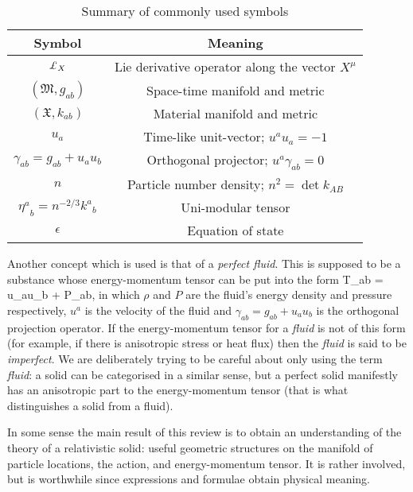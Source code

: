  
{\renewcommand{\arraystretch}{1.4}
\begin{table}%
\begin{center}
\begin{tabular}{||c |  c ||}
\hline
\textbf{Symbol} & \textbf{Meaning} \\
\hline
$\lied{X}$ & Lie derivative operator along the vector $X^{\mu}$\\\hline
$\left(\mathfrak{M}, g_{ab}\right)$ & Space-time manifold and metric\\\hline
$\left(\mathfrak{X}, k_{ab}\right)$ & Material manifold and metric \\\hline
$u_a$ & Time-like unit-vector; $u^au_a = -1$\\\hline
$\gamma_{ab} = g_{ab} + u_au_b$ & Orthogonal projector; $u^a\gamma_{ab}=0$\\\hline
$n$ & Particle number density; $n^2 = \det k_{AB} $\\\hline
${\eta^a}_b = n^{-2/3}{k^a}_b$ & Uni-modular tensor\\\hline
$\epsilon$ & Equation of state
\\\hline
\end{tabular}\caption{Summary of commonly used symbols}\label{tab:common}
\end{center}
\end{table}
}

Another  concept which is used is that of a \textit{perfect fluid}. This is supposed to be a substance whose energy-momentum tensor can be put into the form
\bea
T_{ab} = \rho u_au_b + P\gamma_{ab},
\eea
in which $\rho$ and $P$ are the  fluid's energy density and pressure respectively, $u^a$ is the velocity of the fluid and $\gamma_{ab} = g_{ab} + u_au_b$ is the orthogonal projection operator. If the energy-momentum tensor for a \textit{fluid} is not of this form (for example, if there is anisotropic stress or heat flux) then the \textit{fluid} is said to be   \textit{imperfect}. We are deliberately trying to be careful about only using the term \textit{fluid}: a solid can be categorised in a similar sense, but a perfect solid manifestly has an anisotropic part to the energy-momentum tensor (that is what distinguishes a solid from a fluid).


In some sense the main result of this review is to obtain an understanding of the theory of a relativistic solid: useful geometric structures on the manifold of particle locations, the action, and energy-momentum tensor. It is rather involved, but is worthwhile since expressions and formulae obtain physical meaning.

